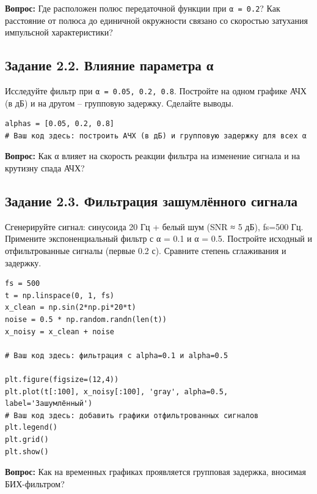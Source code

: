 \documentclass[12pt,a4paper,openany]{book}
\begin{document}
\textbf{Вопрос:} Где расположен полюс передаточной функции при \texttt{α\ =\allowbreak{}\ 0.\allowbreak{}2}? Как расстояние от полюса до единичной окружности связано со скоростью затухания импульсной характеристики?

\subsection*{Задание 2.2. Влияние параметра α}

Исследуйте фильтр при \texttt{α\ =\allowbreak{}\ 0.\allowbreak{}05,\allowbreak{}\ 0.\allowbreak{}2,\allowbreak{}\ 0.\allowbreak{}8}. Постройте на одном графике АЧХ (в дБ) и на другом -- групповую задержку. Сделайте выводы.

\begin{Verbatim}[fontsize=\small, breaklines, breakanywhere, frame=single, framesep=2mm]
alphas = [0.05, 0.2, 0.8]
# Ваш код здесь: построить АЧХ (в дБ) и групповую задержку для всех α
\end{Verbatim}

\textbf{Вопрос:} Как α влияет на скорость реакции фильтра на изменение сигнала и на крутизну спада АЧХ?

\subsection*{Задание 2.3. Фильтрация зашумлённого сигнала}

Сгенерируйте сигнал: синусоида 20 Гц + белый шум (SNR ≈ 5 дБ), fs=500 Гц. Примените экспоненциальный фильтр с α = 0.1 и α = 0.5. Постройте исходный и отфильтрованные сигналы (первые 0.2 с). Сравните степень сглаживания и задержку.

\begin{Verbatim}[fontsize=\small, breaklines, breakanywhere, frame=single, framesep=2mm]
fs = 500
t = np.linspace(0, 1, fs)
x_clean = np.sin(2*np.pi*20*t)
noise = 0.5 * np.random.randn(len(t))
x_noisy = x_clean + noise

# Ваш код здесь: фильтрация с alpha=0.1 и alpha=0.5

plt.figure(figsize=(12,4))
plt.plot(t[:100], x_noisy[:100], 'gray', alpha=0.5, label='Зашумлённый')
# Ваш код здесь: добавить графики отфильтрованных сигналов
plt.legend()
plt.grid()
plt.show()
\end{Verbatim}

\textbf{Вопрос:} Как на временных графиках проявляется групповая задержка, вносимая БИХ-фильтром?
\end{document}
